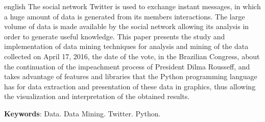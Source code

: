 \begin{resumo}[ABSTRACT]
 \begin{otherlanguage*}{english}
The social network Twitter is used to exchange instant messages, in which a huge amount of data is generated from its members interactions. The large volume of data is made available by the social network allowing its analysis in order to generate useful knowledge. This paper presents the study and implementation of data mining techniques for analysis and mining of the data collected on April 17, 2016, the date of the vote, in the Brazilian Congress, about the continuation of the impeachment process of President Dilma Rousseff, and takes advantage of features and libraries that the Python programming language has for data extraction and presentation of these data in graphics, thus allowing the visualization and interpretation of the obtained results.
   
   \vspace{\onelineskip}
 
   \noindent 
   \textbf{Keywords}: Data. Data Mining. Twitter. Python.
 \end{otherlanguage*}
\end{resumo}